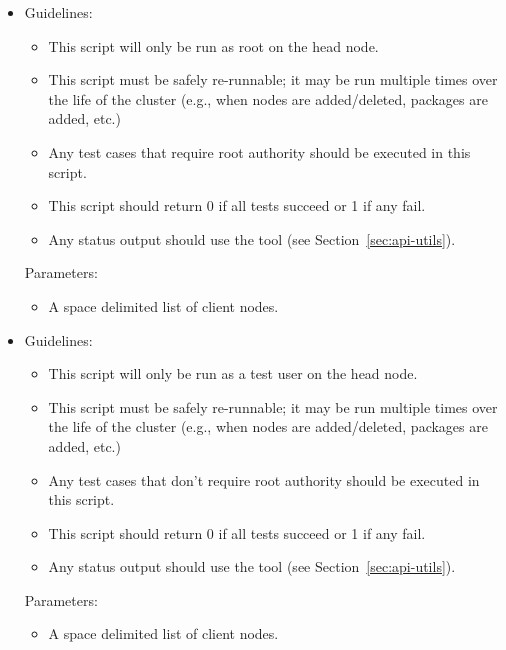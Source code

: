 \begin{itemize}
\item {}

  Guidelines:
  \begin{itemize}
  \item This script will only be run as root on the head node.
  \item This script must be safely re-runnable; it may be run multiple
    times over the life of the cluster (e.g., when nodes are
    added/deleted, packages are added, etc.)
  \item Any test cases that require root authority should be executed
    in this script.
  \item This script should return 0 if all tests succeed or 1 if any
    fail.
  \item Any status output should use the  tool
    (see Section~\ref{sec:api-utils}).
  \end{itemize}

  Parameters:
  
  \begin{itemize}
  \item A space delimited list of client nodes.
  \end{itemize}

\item {}

  Guidelines:
  \begin{itemize}
  \item This script will only be run as a test user on the head node.
  \item This script must be safely re-runnable; it may be run multiple
    times over the life of the cluster (e.g., when nodes are
    added/deleted, packages are added, etc.)
  \item Any test cases that don't require root authority should be executed
    in this script.
  \item This script should return 0 if all tests succeed or 1 if any
    fail.
  \item Any status output should use the  tool
    (see Section~\ref{sec:api-utils}).
  \end{itemize}

  Parameters:
  
  \begin{itemize}
  \item A space delimited list of client nodes.
  \end{itemize}

\end{itemize}

